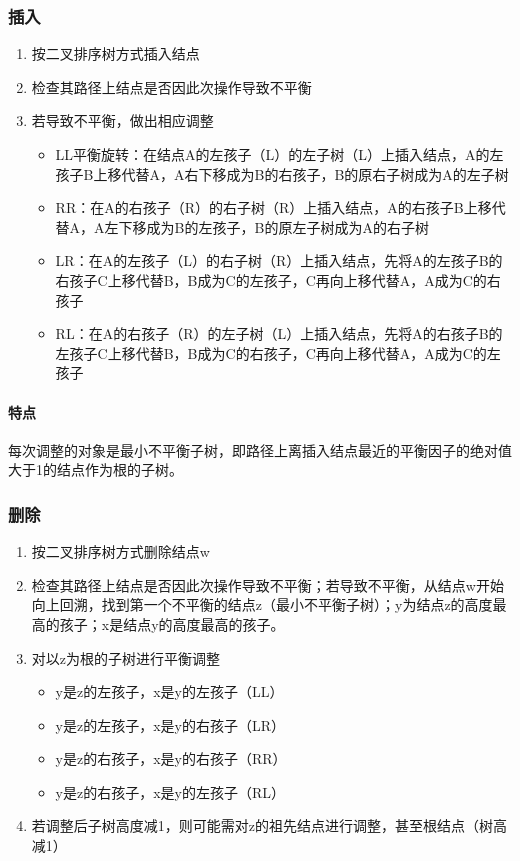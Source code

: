 \subsubsection{插入}
\begin{enumerate}
    \item 按二叉排序树方式插入结点
    \item 检查其路径上结点是否因此次操作导致不平衡
    \item 若导致不平衡，做出相应调整\begin{itemize}
        \item LL平衡旋转：在结点A的左孩子（L）的左子树（L）上插入结点，A的左孩子B上移代替A，A右下移成为B的右孩子，B的原右子树成为A的左子树
        \item RR：在A的右孩子（R）的右子树（R）上插入结点，A的右孩子B上移代替A，A左下移成为B的左孩子，B的原左子树成为A的右子树
        \item LR：在A的左孩子（L）的右子树（R）上插入结点，先将A的左孩子B的右孩子C上移代替B，B成为C的左孩子，C再向上移代替A，A成为C的右孩子
        \item RL：在A的右孩子（R）的左子树（L）上插入结点，先将A的右孩子B的左孩子C上移代替B，B成为C的右孩子，C再向上移代替A，A成为C的左孩子
    \end{itemize}
\end{enumerate}

\paragraph{特点}
每次调整的对象是最小不平衡子树，即路径上离插入结点最近的平衡因子的绝对值大于1的结点作为根的子树。


\subsubsection{删除}
\begin{enumerate}
    \item 按二叉排序树方式删除结点w
    \item 检查其路径上结点是否因此次操作导致不平衡；若导致不平衡，从结点w开始向上回溯，找到第一个不平衡的结点z（最小不平衡子树）；y为结点z的高度最高的孩子；x是结点y的高度最高的孩子。
    \item 对以z为根的子树进行平衡调整\begin{itemize}
        \item y是z的左孩子，x是y的左孩子（LL）
        \item y是z的左孩子，x是y的右孩子（LR）
        \item y是z的右孩子，x是y的右孩子（RR）
        \item y是z的右孩子，x是y的左孩子（RL）
    \end{itemize}
    \item 若调整后子树高度减1，则可能需对z的祖先结点进行调整，甚至根结点（树高减1）
\end{enumerate}


